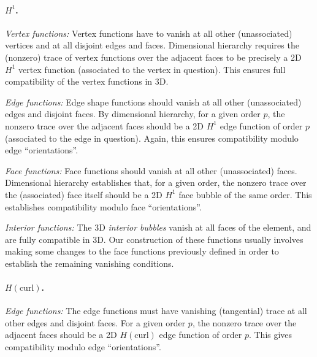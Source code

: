 \paragraph{$H^1$.}
\textit{Vertex functions:}
Vertex functions have to vanish at all other (unassociated) vertices and at all disjoint edges and faces.
Dimensional hierarchy requires the (nonzero) trace of vertex functions over the adjacent faces to be precisely a 2D $H^1$ vertex function (associated to the vertex in question).
This ensures full compatibility of the vertex functions in 3D.

\textit{Edge functions:}
Edge shape functions should vanish at all other (unassociated) edges and disjoint faces.
By dimensional hierarchy, for a given order $p$, the nonzero trace over the adjacent faces should be a 2D $H^1$ edge function of order $p$ (associated to the edge in question).
Again, this ensures compatibility modulo edge ``orientations''.

\textit{Face functions:}
Face functions should vanish at all other (unassociated) faces.
Dimensional hierarchy establishes that, for a given order, the nonzero trace over the (associated) face itself should be a 2D $H^1$ face bubble of the same order.
This establishes compatibility modulo face ``orientations''.

\textit{Interior functions:}
The 3D \textit{interior bubbles} vanish at all faces of the element, and are fully compatible in 3D.
Our construction of these functions usually involves making some changes to the face functions previously defined in order to establish the remaining vanishing conditions.

\paragraph{$H(\mathrm{curl})$.}
\textit{Edge functions:}
The edge functions must have vanishing (tangential) trace at all other edges and disjoint faces.
For a given order $p$, the nonzero trace over the adjacent faces should be a 2D $H(\mathrm{curl})$ edge function of order $p$.
This gives compatibility modulo edge ``orientations''.

